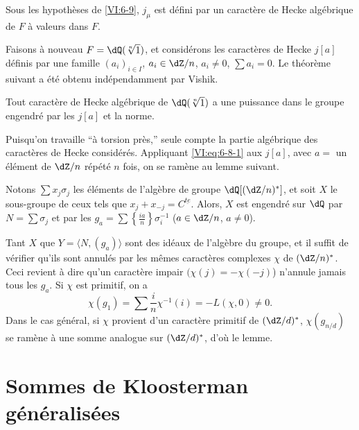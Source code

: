 \begin{proposition_}\label{VI:6-10}
Sous les hypothèses de \ref{VI:6-9}, $j_\mu$ est défini par un caractère 
de Hecke algébrique de $F$ à valeurs dans $F$. 
\end{proposition_}

Faisons à nouveau $F=\dQ(\sqrt[n]{1})$, et considérons les caractères de 
Hecke $j[a]$ définis par une famille $(a_i)_{i\in I}$, $a_i\in \dZ/n$, 
$a_i\ne 0$, $\sum a_i=0$. Le théorème suivant a été obtenu 
indépendamment par Vishik. 





\begin{theorem_}\label{VI:6-11}
Tout caractère de Hecke algébrique de $\dQ(\sqrt[n]{1})$ a une puissance 
dans le groupe engendré par les $j[a]$ et la norme. 
\end{theorem_}

Puisqu'on travaille ``à torsion près,'' seule compte la partie algébrique 
des caractères de Hecke considérés. Appliquant \eqref{VI:eq:6-8-1} aux 
$j[a]$, avec $a=$ un élément de $\dZ/n$ répété $n$ fois, on se 
ramène au lemme suivant.





\begin{lemma_}\label{VI:6-12}
Notons $\sum x_j \sigma_j$ les éléments de l'algèbre de groupe 
$\dQ[(\dZ/n)^\ast]$, et soit $X$ le sous-groupe de ceux tels que 
$x_j+x_{-j}=C^{\underline{t e}}$. Alors, $X$ est engendré sur $\dQ$ par 
$N=\sum \sigma_j$ et par les 
$g_a=\sum \left\{ \frac{i a}{n}\right\} \sigma_i^{-1}$ 
($a\in \dZ/n$, $a\ne 0$). 
\end{lemma_}

Tant $X$ que $Y=\langle N,(g_a)\rangle$ sont des idéaux de l'algèbre du 
groupe, et il suffit de vérifier qu'ils sont annulés par les mêmes 
caractères complexes $\chi$ de $(\dZ/n)^\ast$. Ceci revient à dire qu'un 
caractère impair $(\chi(j)=-\chi(-j)$) n'annule jamais tous les $g_a$. Si 
$\chi$ est primitif, on a 
\[
  \chi(g_1) = \sum \frac i n \chi^{-1}(i) = -L(\chi,0)\ne 0 \text{.} 
\]
Dans le cas général, si $\chi$ provient d'un caractère primitif de 
$(\dZ/d)^\ast$, $\chi(g_{n/d})$ se ramène à une somme analogue sur 
$(\dZ/d)^\ast$, d'où le lemme. 










\section{Sommes de Kloosterman généralisées}\label{VI:7}





